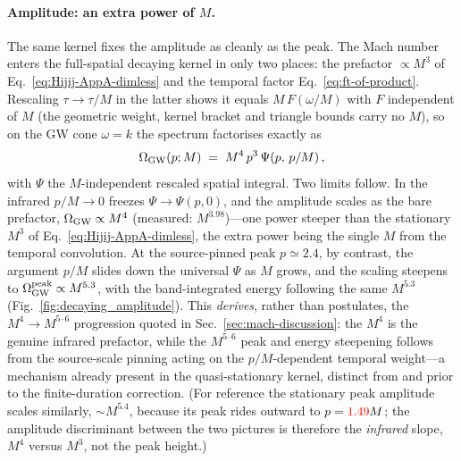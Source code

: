 \documentclass[10pt,prd,aps,nobibnotes,superscriptaddress,preprintnumbers,notitlepage]{revtex4-1}
\newcommand{\add}[1]{{\color{red}#1}}
\newcommand{\add}[1]{#1}
\begin{document}
\paragraph{Amplitude: an extra power of $M$.}
The same kernel fixes the amplitude as cleanly as the peak. The Mach number enters
the full-spatial decaying kernel in only two places: the prefactor $\propto M^3$ of
Eq.~\eqref{eq:Hijij-AppA-dimless} and the temporal factor
Eq.~\eqref{eq:ft-of-product}. Rescaling $\tau\to\tau/M$ in the latter shows it
equals $M\,F(\omega/M)$ with $F$ independent of $M$ (the geometric weight, kernel
bracket and triangle bounds carry no $M$), so on the GW cone $\omega=k$ the spectrum
factorises exactly as
\begin{equation}
  \Omega_{\rm GW}(p;M)\;=\;M^4\,p^3\,\Psi\!\left(p,\,p/M\right),
  \label{eq:decay-amplitude}
\end{equation}
with $\Psi$ the $M$-independent rescaled spatial integral. Two limits follow. In the
infrared $p/M\to0$ freezes $\Psi\to\Psi(p,0)$, and the amplitude scales as the bare
prefactor,
$\Omega_{\rm GW}\propto M^4$ (measured: $M^{3.98}$)---one power steeper than the
stationary $M^3$ of Eq.~\eqref{eq:Hijij-AppA-dimless}, the extra power being the
single $M$ from the temporal convolution. At the source-pinned peak $p\simeq2.4$,
by contrast, the argument $p/M$ slides down the universal $\Psi$ as $M$ grows, and
the scaling steepens to $\Omega_{\rm GW}^{\rm peak}\propto M^{5.3}$, with the
band-integrated energy following the same $M^{5.3}$ (Fig.~\ref{fig:decaying_amplitude}).
This \emph{derives}, rather than postulates, the $M^4\!\to\!M^{5\text{--}6}$
progression quoted in Sec.~\ref{sec:mach-discussion}: the $M^4$ is the genuine
infrared prefactor, while the $M^{5\text{--}6}$ peak and energy steepening follows
from the source-scale pinning acting on the $p/M$-dependent temporal weight---a
mechanism already present in the quasi-stationary kernel, distinct from and prior to
the finite-duration correction. (For reference the stationary peak amplitude scales
similarly, $\sim M^{5.4}$, because its peak rides outward to $p=\add{1.49}M$; the amplitude
discriminant between the two pictures is therefore the \emph{infrared} slope,
$M^4$ versus $M^3$, not the peak height.)
\end{document}
